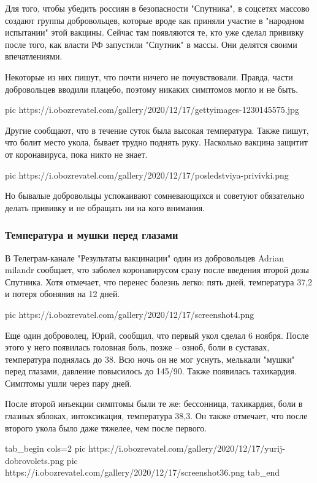 Для того, чтобы убедить россиян в безопасности "Спутника", в соцсетях массово
создают группы добровольцев, которые вроде как приняли участие в "народном
испытании" этой вакцины. Сейчас там появляются те, кто уже сделал прививку
после того, как власти РФ запустили "Спутник" в массы. Они делятся своими
впечатлениями.

Некоторые из них пишут, что почти ничего не почувствовали. Правда, части
добровольцев вводили плацебо, поэтому никаких симптомов могло и не быть.

\ifcmt
pic https://i.obozrevatel.com/gallery/2020/12/17/gettyimages-1230145575.jpg
\fi

Другие сообщают, что в течение суток была высокая температура. Также пишут, что
болит место укола, бывает трудно поднять руку. Насколько вакцина защитит от
коронавируса, пока никто не знает.

\ifcmt
pic https://i.obozrevatel.com/gallery/2020/12/17/posledstviya-privivki.png
\fi

Но бывалые добровольцы успокаивают сомневающихся и советуют обязательно делать
прививку и не обращать ни на кого внимания.

\subsubsection{Температура и мушки перед глазами}

В Телеграм-канале "Результаты вакцинации" один из добровольцев Adrian milandr
сообщает, что заболел коронавирусом сразу после введения второй дозы Спутника.
Хотя отмечает, что перенес болезнь легко: пять дней, температура 37,2 и потеря
обоняния на 12 дней.

\ifcmt
pic https://i.obozrevatel.com/gallery/2020/12/17/screenshot4.png
\fi

Еще один доброволец, Юрий, сообщил, что первый укол сделал 6 ноября. После
этого у него появилась головная боль, позже – озноб, боли в суставах,
температура поднялась до 38. Всю ночь он не мог уснуть, мелькали "мушки" перед
глазами, давление повысилось до 145/90. Также появилась тахикардия. Симптомы
ушли через пару дней.

После второй инъекции симптомы были те же: бессонница, тахикардия, боли в
глазных яблоках, интоксикация, температура 38,3. Он также отмечает, что после
второго укола было даже тяжелее, чем после первого.

\ifcmt
tab_begin cols=2
	pic https://i.obozrevatel.com/gallery/2020/12/17/yurij-dobrovolets.png
	pic https://i.obozrevatel.com/gallery/2020/12/17/screenshot36.png
tab_end
\fi

